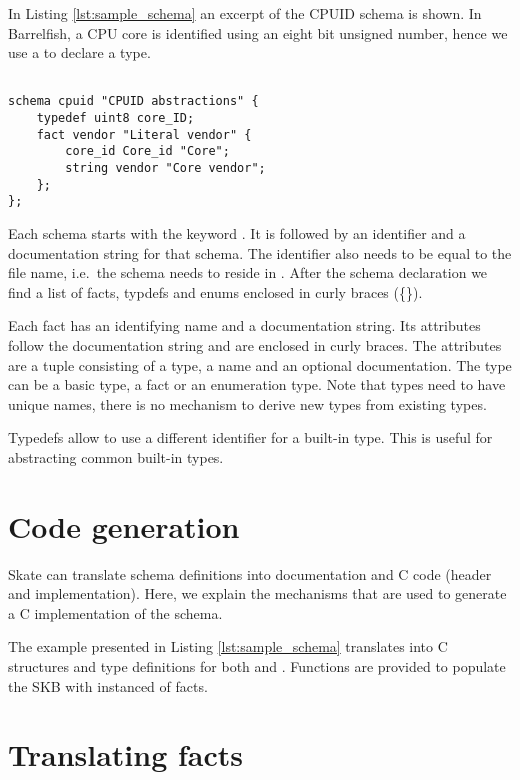 \documentclass[a4paper,11pt,twoside]{report}
\begin{document}
{{In Listing \ref{lst:sample_schema} an excerpt of the CPUID schema is shown. In
Barrelfish, a CPU core is identified using an eight bit unsigned number, hence
we use a  to declare a  type.

\begin{lstlisting}[caption={Sample Skate schema definition},
label={lst:sample_schema},language=Skate]

schema cpuid "CPUID abstractions" {
    typedef uint8 core_ID;
    fact vendor "Literal vendor" {
        core_id Core_id "Core";
        string vendor "Core vendor";
    };
};
\end{lstlisting}

Each schema starts with the keyword . It is followed by an
identifier and a documentation string for that schema. The identifier also needs
to be equal to the file name, i.e.~the schema  needs to reside in
. After the schema declaration we find a list of facts,
typdefs and enums enclosed in curly braces (\{\}).

Each fact has an identifying name and a documentation string. Its attributes
follow the documentation string and are enclosed in curly braces. The attributes
are a tuple consisting of a type, a name and an optional documentation. The type
can be a basic type, a fact or an enumeration type. Note that types need to have
unique names, there is no mechanism to derive new types from existing types.

Typedefs allow to use a different identifier for a built-in type. This is useful
for abstracting common built-in types.


\section{Code generation}

Skate can translate schema definitions into documentation and C code (header
and implementation). Here, we explain the mechanisms that are used to generate a
C implementation of the schema.

The example presented in Listing \ref{lst:sample_schema} translates into C
structures and type definitions for both  and
. Functions are provided to populate the SKB with instanced of
facts.

\section{Translating facts}

}}
\end{document}
